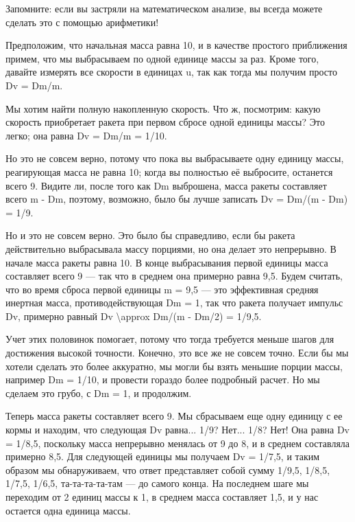 \documentclass[10pt,oneside]{article}
\newcommand{\TipsRunning}[1]{\par\vspace{2bp}{\centering\footnotesize #1\par}\vspace{2bp}}
\newcommand{\TipsSubsection}[1]{\par\vspace{6bp}{\normalsize\bfseries #1\par}\vspace{2bp}}
\begin{document}
Запомните: если вы застряли на математическом анализе, вы всегда можете сделать это с помощью арифметики!\par

\TipsSubsection{3-4 Численное интегрирование}

Предположим, что начальная масса равна 10, и в качестве простого приближения примем, что мы выбрасываем по одной единице массы за раз. Кроме того, давайте измерять все скорости в единицах u, так как тогда мы получим просто Dv = Dm/m.\par

Мы хотим найти полную накопленную скорость. Что ж, посмотрим: какую скорость приобретает ракета при первом сбросе одной единицы массы? Это легко; она равна Dv = Dm/m = 1/10.\par

Но это не совсем верно, потому что пока вы выбрасываете одну единицу массы, реагирующая масса не равна 10; когда вы полностью её выбросите, останется всего 9. Видите ли, после того как Dm выброшена, масса ракеты составляет всего m - Dm, поэтому, возможно, было бы лучше записать Dv = Dm/(m - Dm) = 1/9.\par

Но и это не совсем верно. Это было бы справедливо, если бы ракета действительно выбрасывала массу порциями, но она делает это непрерывно. В начале масса ракеты равна 10. В конце выбрасывания первой единицы масса составляет всего 9 --- так что в среднем она примерно равна 9,5. Будем считать, что во время сброса первой единицы m = 9,5 --- это эффективная средняя инертная масса, противодействующая Dm = 1, так что ракета получает импульс Dv, примерно равный Dv \textbackslash{}approx Dm/(m - Dm/2) = 1/9,5.\par

Учет этих половинок помогает, потому что тогда требуется меньше шагов для достижения высокой точности. Конечно, это все же не совсем точно. Если бы мы хотели сделать это более аккуратно, мы могли бы взять меньшие порции массы, например Dm = 1/10, и провести гораздо более подробный расчет. Но мы сделаем это грубо, с Dm = 1, и продолжим.\par

\TipsRunning{З А Д А Ч И  И  Р Е Ш Е Н И Я • 1 0 3}

Теперь масса ракеты составляет всего 9. Мы сбрасываем еще одну единицу с ее кормы и находим, что следующая Dv равна... 1/9? Нет... 1/8? Нет! Она равна Dv = 1/8,5, поскольку масса непрерывно менялась от 9 до 8, и в среднем составляла примерно 8,5. Для следующей единицы мы получаем Dv = 1/7,5, и таким образом мы обнаруживаем, что ответ представляет собой сумму 1/9,5, 1/8,5, 1/7,5, 1/6,5, та-та-та-та-там --- до самого конца. На последнем шаге мы переходим от 2 единиц массы к 1, в среднем масса составляет 1,5, и у нас остается одна единица массы.\par
\end{document}

